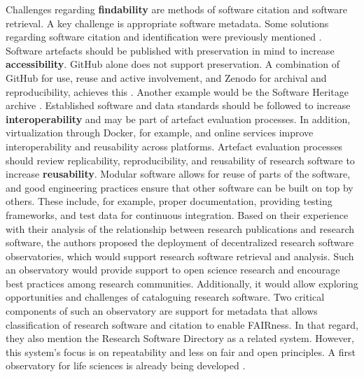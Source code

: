 Challenges regarding \textbf{findability} are methods of software citation and software retrieval. A key challenge is appropriate software metadata. 
Some solutions regarding software citation and identification were previously mentioned \cite{noauthor_codemeta_2021, druskat_citation_2021}.
Software artefacts should be published with preservation in mind to increase \textbf{accessibility}. GitHub alone does not support preservation. A combination of GitHub for use, reuse and active involvement, and Zenodo for archival and reproducibility, achieves this \cite{noauthor_github_nodate}. Another example would be the Software Heritage archive \cite{di_cosmo_software_2017}.
Established software and data standards should be followed to increase \textbf{interoperability} and may be part of artefact evaluation processes. In addition, virtualization through Docker, for example, and online services improve interoperability and reusability across platforms.
Artefact evaluation processes should review replicability, reproducibility, and reusability of research software to increase \textbf{reusability}. Modular software allows for reuse of parts of the software, and good engineering practices ensure that other software can be built on top by others. These include, for example, proper documentation, providing testing frameworks, and test data for continuous integration.
Based on their experience with their analysis of the relationship between research publications and research software, the authors proposed the deployment of decentralized research software observatories, which would support research software retrieval and analysis. Such an observatory would provide support to open science research and encourage best practices among research communities. Additionally, it would allow exploring opportunities and challenges of cataloguing research software. Two critical components of such an observatory are support for metadata that allows classification of research software and citation to enable FAIRness. In that regard, they also mention the Research Software Directory \cite{spaaks_research_2020} as a related system. 
However, this system's focus is on repeatability and less on \acrshort{fair} and open principles. A first observatory for life sciences is already being developed \cite{martin_del_pico_automating_2020, pico_fairsoft_2022}.


